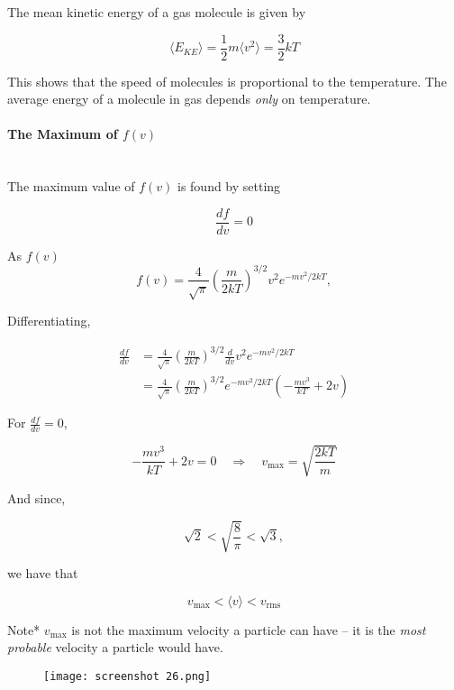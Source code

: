 \documentclass[svgnames]{article}     %
\begin{document}
The mean kinetic energy of a gas molecule is given by 

\[
  \langle E_{KE} \rangle = \frac{1}{2}m\langle v^2 \rangle = \frac{3}{2}kT
\] \vspace{5px}

This shows that the speed of molecules is proportional to the temperature. The
average energy of a molecule in gas depends \textit{only} on temperature. 

\paragraph{The Maximum of $f(v)$ } \mbox{}\\

The maximum value of $f(v)$ is found by setting 

\[
\frac{d f}{d v} = 0
\] \vspace{5px}

As $f(v)$ 
\[
f(v) = \frac{4}{\sqrt{\pi}} \left( \frac{m}{2kT} \right)^{3/2} v^2 e^{-mv^2
/ 2kT},
\] \vspace{5px}

Differentiating, 

\begin{align*}
  \frac{d f}{d v} &= \frac{4}{\sqrt{\pi}}\left( \frac{m}{2kT} \right)^{3/2}
  \frac{d}{dv} v^2 e^{-mv^2 / 2kT} \\
                  &= \frac{4}{\sqrt{\pi}}\left( \frac{m}{2kT} \right)^{3/2}
                  e^{-mv^2/2kT}\left( -\frac{mv^3}{kT} +2v \right)  
\end{align*}

For $ \frac{df}{dv} = 0$, 

\[
  -\frac{mv^3}{kT} + 2v = 0 \quad \Rightarrow \quad v_\text{max} = \sqrt{\frac{2kT}{m}}
\] \vspace{5px}

And since, 

\[
\sqrt{2} < \sqrt{\frac{8}{\pi}} < \sqrt{3}, 
\] \vspace{5px}

we have that 

\[
  v_\text{max} < \langle v \rangle < v_\text{rms}
\] \vspace{5px}

Note* $v_\text{max}$ is not the maximum velocity a particle can have -- it is the
\textit{most probable} velocity a particle would have. 


\begin{figure}[H]
  \centering
    \texttt{[image: screenshot 26.png]}
\end{figure}
\end{document}
